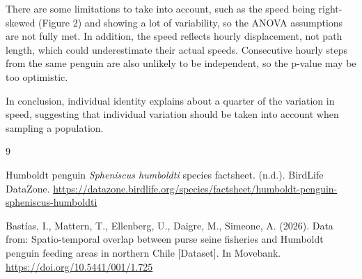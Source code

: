 \documentclass{article}
\begin{document}
\indent There are some limitations to take into account, such as the speed being right-skewed (Figure 2) and showing a lot of variability, so the ANOVA assumptions are not fully met. In addition, the speed reflects hourly displacement, not path length, which could underestimate their actual speeds. Consecutive hourly steps from the same penguin are also unlikely to be independent, so the p-value may be too optimistic.

\indent In conclusion, individual identity explains about a quarter of the variation in speed, suggesting that individual variation should be taken into account when sampling a population.

\begin{thebibliography}{9}

Humboldt penguin \textit{Spheniscus humboldti} species factsheet. (n.d.). 
BirdLife DataZone. 
\url{https://datazone.birdlife.org/species/factsheet/humboldt-penguin-spheniscus-humboldti}

Bastías, I., Mattern, T., Ellenberg, U., Daigre, M., Simeone, A. (2026). Data from: Spatio-temporal overlap between purse seine fisheries and Humboldt penguin feeding areas in northern Chile [Dataset]. In Movebank. \url{https://doi.org/10.5441/001/1.725}

\end{thebibliography}
\end{document}
